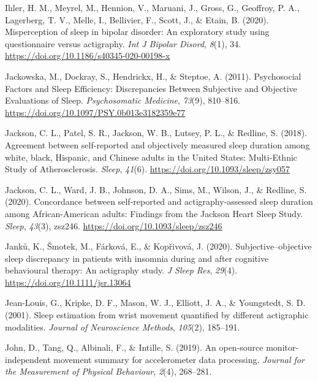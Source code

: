 \documentclass[
]{article}
\newlength{\cslhangindent}
\newenvironment{CSLReferences}[2] %
 {\begin{list}{}{%
  \setlength{\itemindent}{0pt}
  \setlength{\leftmargin}{0pt}
  \setlength{\parsep}{0pt}
  \ifodd #1
   \setlength{\leftmargin}{\cslhangindent}
   \setlength{\itemindent}{-1\cslhangindent}
  \fi
  \setlength{\itemsep}{#2\baselineskip}}}
 {\end{list}}
\begin{document}
\begin{CSLReferences}{1}{0}
Ihler, H. M., Meyrel, M., Hennion, V., Maruani, J., Gross, G., Geoffroy, P. A., Lagerberg, T. V., Melle, I., Bellivier, F., Scott, J., \& Etain, B. (2020). Misperception of sleep in bipolar disorder: An exploratory study using questionnaire versus actigraphy. \emph{Int J Bipolar Disord}, \emph{8}(1), 34. \url{https://doi.org/10.1186/s40345-020-00198-x}

Jackowska, M., Dockray, S., Hendrickx, H., \& Steptoe, A. (2011). Psychosocial {Factors} and {Sleep} {Efficiency}: {Discrepancies} {Between} {Subjective} and {Objective} {Evaluations} of {Sleep}. \emph{Psychosomatic Medicine}, \emph{73}(9), 810--816. \url{https://doi.org/10.1097/PSY.0b013e3182359e77}

Jackson, C. L., Patel, S. R., Jackson, W. B., Lutsey, P. L., \& Redline, S. (2018). Agreement between self-reported and objectively measured sleep duration among white, black, {Hispanic}, and {Chinese} adults in the {United} {States}: {Multi}-{Ethnic} {Study} of {Atherosclerosis}. \emph{Sleep}, \emph{41}(6). \url{https://doi.org/10.1093/sleep/zsy057}

Jackson, C. L., Ward, J. B., Johnson, D. A., Sims, M., Wilson, J., \& Redline, S. (2020). Concordance between self-reported and actigraphy-assessed sleep duration among {African}-{American} adults: Findings from the {Jackson} {Heart} {Sleep} {Study}. \emph{Sleep}, \emph{43}(3), zsz246. \url{https://doi.org/10.1093/sleep/zsz246}

Janků, K., Šmotek, M., Fárková, E., \& Kopřivová, J. (2020). Subjective--objective sleep discrepancy in patients with insomnia during and after cognitive behavioural therapy: {An} actigraphy study. \emph{J Sleep Res}, \emph{29}(4). \url{https://doi.org/10.1111/jsr.13064}

Jean-Louis, G., Kripke, D. F., Mason, W. J., Elliott, J. A., \& Youngstedt, S. D. (2001). Sleep estimation from wrist movement quantified by different actigraphic modalities. \emph{Journal of Neuroscience Methods}, \emph{105}(2), 185--191.

John, D., Tang, Q., Albinali, F., \& Intille, S. (2019). An open-source monitor-independent movement summary for accelerometer data processing. \emph{Journal for the Measurement of Physical Behaviour}, \emph{2}(4), 268--281.


\end{CSLReferences}
\end{document}
